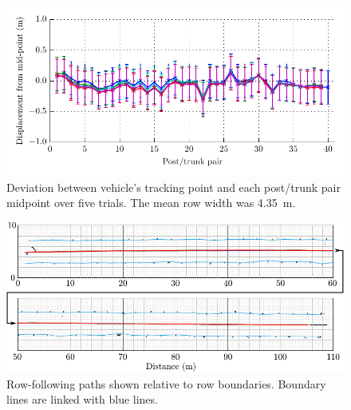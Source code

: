 \documentclass[preprint,authoryear,12pt]{elsarticle}
\begin{document}
    \begin{figure}[htb]
        \centering
        \includegraphics{imgs/slam/row_tracking_averages.pdf}
        \caption{
            Deviation between vehicle's tracking point and each post/trunk pair midpoint over five trials.
            The mean row width was \SI{4.35}{\meter}.
        }
        \label{fig:row_following_performance_analysis}
    \end{figure}

    \begin{figure}[htb]
        \centering
        \includegraphics[width=\linewidth]{imgs/slam/row_tracking_segmented.pdf}
        \caption{
            Row-following paths shown relative to row boundaries.
            Boundary lines are linked with blue lines.
        }
        \label{fig:row_following_paths_segmented}
    \end{figure}
\end{document}
